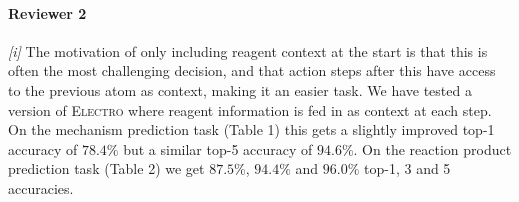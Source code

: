 \documentclass{article}
\newcommand{\ourModel}{\textsc{Electro}\xspace}
\begin{document}
% 



\vspace{-5pt}
\paragraph{Reviewer 2}
\emph{[i]}
The motivation of only including reagent context at the start is that this is often the most challenging decision, and that action steps after this have access to the previous atom as context, making it an easier task.
We have tested a version of \ourModel where reagent information is fed in as context at each step. 
On the mechanism prediction task (Table 1) this gets a slightly improved top-1 accuracy of $78.4\%$ but a similar top-5 accuracy of $94.6\%$.
 On the reaction product prediction task (Table 2) we get $87.5\%$, $94.4\%$ and $96.0\%$ top-1, 3 and 5 accuracies.
\end{document}
